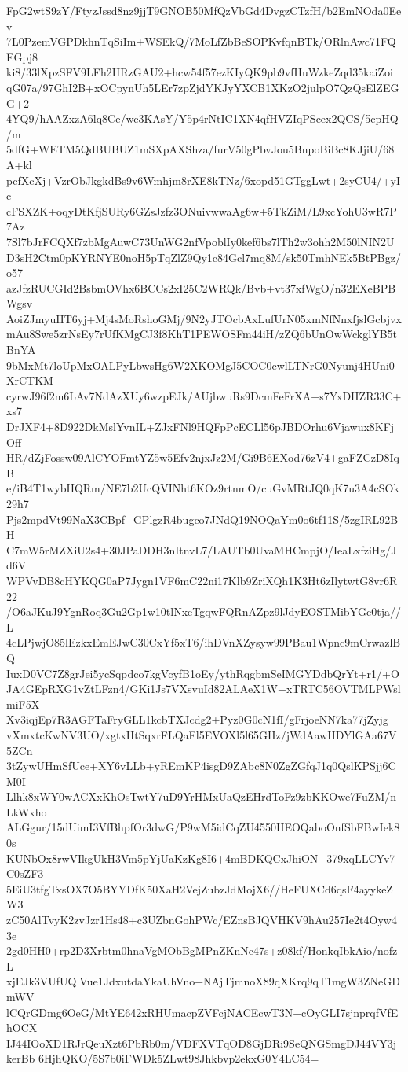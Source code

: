 FpG2wtS9zY/FtyzJssd8nz9jjT9GNOB50MfQzVbGd4DvgzCTzfH/b2EmNOda0Eev
7L0PzemVGPDkhnTqSiIm+WSEkQ/7MoLfZbBeSOPKvfqnBTk/ORlnAwc71FQEGpj8
ki8/33lXpzSFV9LFh2HRzGAU2+hcw54f57ezKIyQK9pb9vfHuWzkeZqd35kaiZoi
qG07a/97GhI2B+xOCpynUh5LEr7zpZjdYKJyYXCB1XKzO2julpO7QzQsElZEGG+2
4YQ9/hAAZxzA6lq8Ce/wc3KAsY/Y5p4rNtIC1XN4qfHVZIqPScex2QCS/5cpHQ/m
5dfG+WETM5QdBUBUZ1mSXpAXShza/furV50gPbvJou5BnpoBiBc8KJjiU/68A+kl
pcfXcXj+VzrObJkgkdBs9v6Wmhjm8rXE8kTNz/6xopd51GTggLwt+2syCU4/+yIc
cFSXZK+oqyDtKfjSURy6GZsJzfz3ONuivwwaAg6w+5TkZiM/L9xcYohU3wR7P7Az
7Sl7bJrFCQXf7zbMgAuwC73UnWG2nfVpoblIy0kef6bs7lTh2w3ohh2M50lNIN2U
D3sH2Ctm0pKYRNYE0noH5pTqZlZ9Qy1c84Gcl7mq8M/sk50TmhNEk5BtPBgz/o57
azJfzRUCGId2BsbmOVhx6BCCs2xI25C2WRQk/Bvb+vt37xfWgO/n32EXeBPBWgsv
AoiZJmyuHT6yj+Mj4sMoRshoGMj/9N2yJTOcbAxLufUrN05xmNfNnxfjslGcbjvx
mAu8Swe5zrNsEy7rUfKMgCJ3f8KhT1PEWOSFm44iH/zZQ6bUnOwWckglYB5tBnYA
9bMxMt7loUpMxOALPyLbwsHg6W2XKOMgJ5COC0cwlLTNrG0Nyunj4HUni0XrCTKM
cyrwJ96f2m6LAv7NdAzXUy6wzpEJk/AUjbwuRs9DcmFeFrXA+s7YxDHZR33C+xs7
DrJXF4+8D922DkMslYvnIL+ZJxFNl9HQFpPcECLl56pJBDOrhu6Vjawux8KFjOff
HR/dZjFossw09AlCYOFmtYZ5w5Efv2njxJz2M/Gi9B6EXod76zV4+gaFZCzD8IqB
e/iB4T1wybHQRm/NE7b2UcQVINht6KOz9rtnmO/cuGvMRtJQ0qK7u3A4cSOk29h7
Pjs2mpdVt99NaX3CBpf+GPlgzR4bugco7JNdQ19NOQaYm0o6tf11S/5zgIRL92BH
C7mW5rMZXiU2s4+30JPaDDH3nItnvL7/LAUTb0UvaMHCmpjO/IeaLxfziHg/Jd6V
WPVvDB8cHYKQG0aP7Jygn1VF6mC22ni17Klb9ZriXQh1K3Ht6zIlytwtG8vr6R22
/O6aJKuJ9YgnRoq3Gu2Gp1w10tlNxeTgqwFQRnAZpz9lJdyEOSTMibYGc0tja//L
4cLPjwjO85lEzkxEmEJwC30CxYf5xT6/ihDVnXZysyw99PBau1Wpnc9mCrwazlBQ
IuxD0VC7Z8grJei5ycSqpdco7kgVcyfB1oEy/ythRqgbmSeIMGYDdbQrYt+r1/+O
JA4GEpRXG1vZtLFzn4/GKi1Js7VXsvuId82ALAeX1W+xTRTC56OVTMLPWslmiF5X
Xv3iqjEp7R3AGFTaFryGLL1kcbTXJcdg2+Pyz0G0cN1fI/gFrjoeNN7ka77jZyjg
vXmxtcKwNV3UO/xgtxHtSqxrFLQaFl5EVOXl5l65GHz/jWdAawHDYlGAa67V5ZCn
3tZywUHmSfUce+XY6vLLb+yREmKP4isgD9ZAbc8N0ZgZGfqJ1q0QslKPSjj6CM0I
Llhk8xWY0wACXxKhOsTwtY7uD9YrHMxUaQzEHrdToFz9zbKKOwe7FuZM/nLkWxho
ALGgur/15dUimI3VfBhpfOr3dwG/P9wM5idCqZU4550HEOQaboOnfSbFBwIek80s
KUNbOx8rwVIkgUkH3Vm5pYjUaKzKg8I6+4mBDKQCxJhiON+379xqLLCYv7C0sZF3
5EiU3tfgTxsOX7O5BYYDfK50XaH2VejZubzJdMojX6//HeFUXCd6qsF4ayykeZW3
zC50AlTvyK2zvJzr1Hs48+c3UZbnGohPWc/EZnsBJQVHKV9hAu257Ie2t4Oyw43e
2gd0HH0+rp2D3Xrbtm0hnaVgMObBgMPnZKnNc47s+z08kf/HonkqIbkAio/nofzL
xjEJk3VUfUQlVue1JdxutdaYkaUhVno+NAjTjmnoX89qXKrq9qT1mgW3ZNeGDmWV
lCQrGDmg6OeG/MtYE642xRHUmacpZVFcjNACEcwT3N+cOyGLI7sjnprqfVfEhOCX
IJ44IOoXD1RJrQeuXzt6PbRb0m/VDFXVTqOD8GjDRi9SeQNGSmgDJ44VY3jkerBb
6HjhQKO/5S7b0iFWDk5ZLwt98Jhkbvp2ekxG0Y4LC54=
